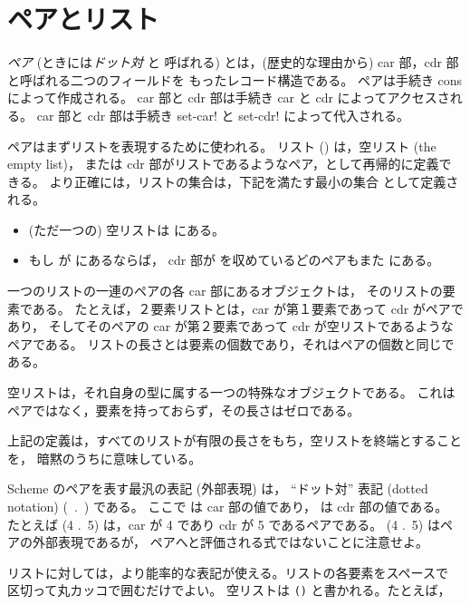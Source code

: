 \section{ペアとリスト}
\label{listsection}

{\em ペア}  (ときには{\em ドット対}  と
呼ばれる) とは，(歴史的な理由から) car 部，cdr 部と呼ばれる二つのフィールドを
もったレコード構造である。
ペアは手続き {\cf cons} によって作成される。
car 部と cdr 部は手続き {\cf car} と {\cf cdr} によってアクセスされる。
car 部と cdr 部は手続き {\cf set-car!} と {\cf set-cdr!} によって代入される。

ペアはまずリストを表現するために使われる。
リスト () は，空リスト (the empty list)，
または cdr 部がリストであるようなペア，として再帰的に定義できる。
より正確には，リストの集合は，下記を満たす最小の集合  として定義される。

\begin{itemize}
\item (ただ一つの) 空リストは  にある。
\item もし  が  にあるならば，
      cdr 部が  を収めているどのペアもまた  にある。
\end{itemize}

一つのリストの一連のペアの各 car 部にあるオブジェクトは，
そのリストの要素である。
たとえば，２要素リストとは，car が第１要素であって cdr がペアであり，
そしてそのペアの car が第２要素であって cdr が空リストであるようなペアである。
リストの長さとは要素の個数であり，それはペアの個数と同じである。

空リストは，それ自身の型に属する一つの特殊なオブジェクトである。
これはペアではなく，要素を持っておらず，その長さはゼロである。

\begin{note}
上記の定義は，すべてのリストが有限の長さをもち，空リストを終端とすることを，
暗黙のうちに意味している。
\end{note}

Scheme のペアを表す最汎の表記 (外部表現) は，
``ドット対'' 表記 (dotted notation) \hbox{\cf ( .\ )} である。
ここで  は car 部の値であり， は cdr 部の値である。
たとえば {\cf (4 .\ 5)} は，car が 4 であり cdr が 5 であるペアである。
{\cf (4 .\ 5)} はペアの外部表現であるが，
ペアへと評価される式ではないことに注意せよ。

リストに対しては，より能率的な表記が使える。リストの各要素をスペースで
区切って丸カッコで囲むだけでよい。
空リストは {\tt()} と書かれる。たとえば，


